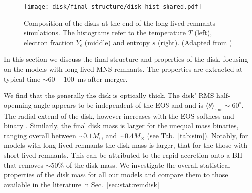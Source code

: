 \begin{figure*}[t]
    \centering 
    \texttt{[image: disk/final\_structure/disk\_hist\_shared.pdf]}
    \caption{Composition of the disks at the end of the long-lived
        remnants simulations. The histograms refer to the temperature $T$
        (left),
        electron fraction $Y_e$
        (middle) and entropy $s$ (right).
        (Adapted from \citet{Nedora:2020pak})
    }
    \label{fig:final_disk_struct_hist_long}
\end{figure*}

In this section we discuss the final structure and properties of the disk, 
focusing on the models with long-lived \ac{MNS} remnants.
The properties are extracted at typical time $\sim60{-}100$~ms after merger.

We find that the generally the disk is optically thick.
The disk' \ac{RMS} half-openning angle appears to be independent of the 
\ac{EOS} and \mr{} and is $\langle\theta\rangle_{\text{rms}}\sim60^{\circ}$. 
The radial extend of the disk, however increases with the \ac{EOS} softness and 
binary \mr{}.
Similarly, the final disk mass is larger for the unequal mass binaries, 
ranging overall between ${\sim}0.1M_{\odot}$ and ${\sim}0.4M_{\odot}$
(see Tab.~\ref{tab:sim}).
Notably, for models with long-lived remnants the disk mass is larger,
that for the those with short-lived remnants. This can be attributed to the 
rapid accretion onto a \ac{BH} that removes $\sim50\%$ of the disk mass.
%
We investigate the overall statistical properties of the disk mass for all our models
and compare them to those available in the literature in Sec.~\ref{sec:stat:remdisk}
%

